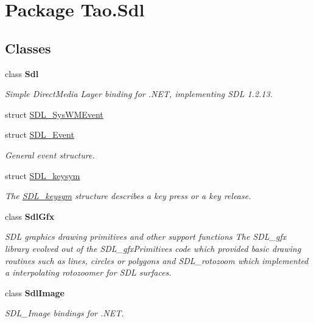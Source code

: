 \hypertarget{namespace_tao_1_1_sdl}{
\section{Package Tao.Sdl}
\label{namespace_tao_1_1_sdl}
}
\subsection*{Classes}
\begin{DoxyCompactItemize}
\item 
class {\bfseries Sdl}
\begin{DoxyCompactList}\small\item\em Simple DirectMedia Layer binding for .NET, implementing SDL 1.2.13. \item\end{DoxyCompactList}\item 
struct \hyperlink{struct_tao_1_1_sdl_1_1_s_d_l___sys_w_m_event}{SDL\_\-SysWMEvent}
\item 
struct \hyperlink{struct_tao_1_1_sdl_1_1_s_d_l___event}{SDL\_\-Event}
\begin{DoxyCompactList}\small\item\em General event structure. \item\end{DoxyCompactList}\item 
struct \hyperlink{struct_tao_1_1_sdl_1_1_s_d_l__keysym}{SDL\_\-keysym}
\begin{DoxyCompactList}\small\item\em The \hyperlink{struct_tao_1_1_sdl_1_1_s_d_l__keysym}{SDL\_\-keysym} structure describes a key press or a key release. \item\end{DoxyCompactList}\item 
class {\bfseries SdlGfx}
\begin{DoxyCompactList}\small\item\em SDL graphics drawing primitives and other support functions The SDL\_\-gfx library evolved out of the SDL\_\-gfxPrimitives code which provided basic drawing routines such as lines, circles or polygons and SDL\_\-rotozoom which implemented a interpolating rotozoomer for SDL surfaces. \item\end{DoxyCompactList}\item 
class {\bfseries SdlImage}
\begin{DoxyCompactList}\small\item\em SDL\_\-Image bindings for .NET. \item\end{DoxyCompactList}\item 

\end{DoxyCompactItemize}
